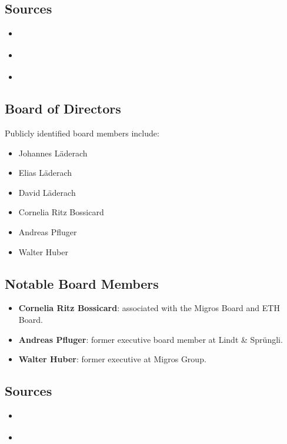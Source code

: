 \subsection*{Sources}

\begin{itemize}
    \item \cite{wikipediaLaederach}
    \item \cite{laderachLeadershipNextGeneration}
    \item \cite{leadiqLaederach}
\end{itemize}

\subsection{Board of Directors}

Publicly identified board members include:

\begin{itemize}
    \item Johannes Läderach
    \item Elias Läderach
    \item David Läderach
    \item Cornelia Ritz Bossicard
    \item Andreas Pfluger
    \item Walter Huber
\end{itemize}

\subsection{Notable Board Members}

\begin{itemize}
    \item \textbf{Cornelia Ritz Bossicard}: associated with the Migros Board and ETH Board.
    \item \textbf{Andreas Pfluger}: former executive board member at Lindt \& Sprüngli.
    \item \textbf{Walter Huber}: former executive at Migros Group.
\end{itemize}

\subsection*{Sources}

\begin{itemize}
    \item \cite{laderachLeadershipNextGeneration}
    \item \cite{lindtSpruengliOfficial}
\end{itemize}

